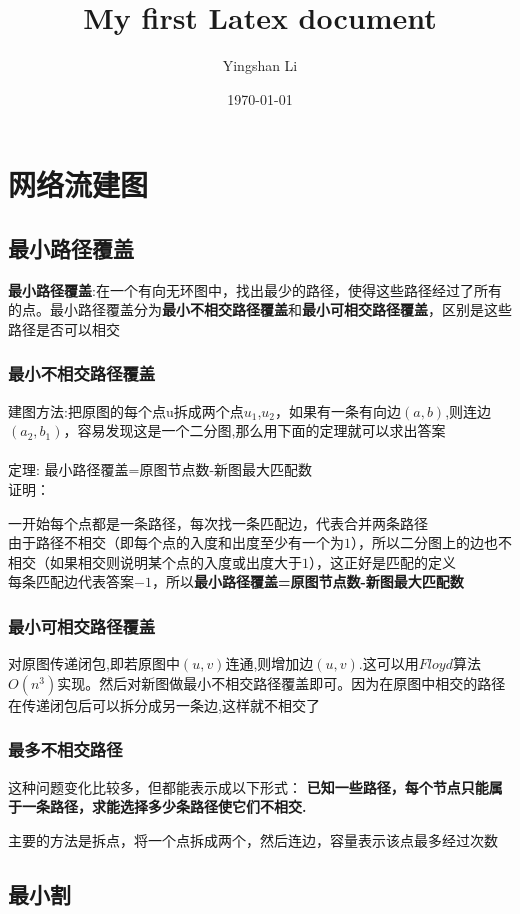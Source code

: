\documentclass[12pt, a4paper, oneside]{ctexart}
\title{My first Latex document}
\author{Yingshan Li}
\date{\today}
\begin{document}
 




\section{网络流建图} 
\subsection{最小路径覆盖} 
\textbf{最小路径覆盖}:在一个有向无环图中，找出最少的路径，使得这些路径经过了所有的点。最小路径覆盖分为\textbf{最小不相交路径覆盖}和\textbf{最小可相交路径覆盖}，区别是这些路径是否可以相交

\subsubsection{最小不相交路径覆盖}
建图方法:把原图的每个点u拆成两个点$u_{1}$,$u_{2}$，如果有一条有向边$(a,b)$,则连边$(a_{2},b_{1})$，容易发现这是一个二分图,那么用下面的定理就可以求出答案
\\\\
定理: 最小路径覆盖=原图节点数-新图最大匹配数
\\
证明：
\par
一开始每个点都是一条路径，每次找一条匹配边，代表合并两条路径\\
由于路径不相交（即每个点的入度和出度至少有一个为$1$），所以二分图上的边也不相交（如果相交则说明某个点的入度或出度大于$1$），这正好是匹配的定义\\
每条匹配边代表答案$-1$，所以\textbf{最小路径覆盖=原图节点数-新图最大匹配数}

\subsubsection{最小可相交路径覆盖}
对原图传递闭包,即若原图中$(u,v)$连通,则增加边$(u,v)$.这可以用$Floyd$算法$O(n^{3})$实现。然后对新图做最小不相交路径覆盖即可。因为在原图中相交的路径在传递闭包后可以拆分成另一条边,这样就不相交了

\subsubsection{最多不相交路径} 
这种问题变化比较多，但都能表示成以下形式：
\textbf{已知一些路径，每个节点只能属于一条路径，求能选择多少条路径使它们不相交.}\par
主要的方法是拆点，将一个点拆成两个，然后连边，容量表示该点最多经过次数


\subsection{最小割}
\end{document}
